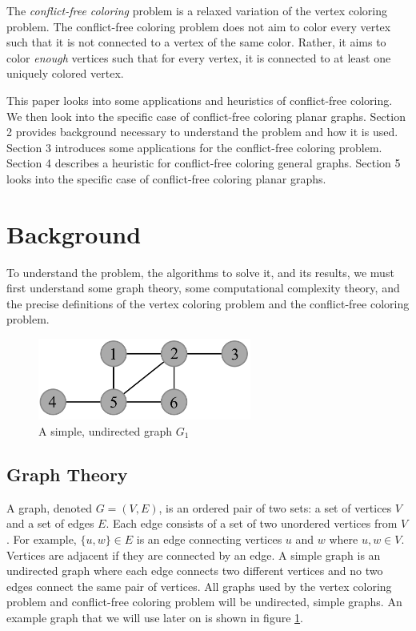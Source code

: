 \documentclass{sig-alternate}
\begin{document}
The \emph{conflict-free coloring} problem is a relaxed variation of the vertex coloring problem. The conflict-free coloring problem does not aim to color every vertex such that it is not connected to a vertex of the same color. Rather, it aims to color \emph{enough} vertices such that for every vertex, it is connected to at least one uniquely colored vertex.

This paper looks into some applications and heuristics of conflict-free coloring. We then look into the specific case of conflict-free coloring planar graphs. Section 2 provides background necessary to understand the problem and how it is used. Section 3 introduces some applications for the conflict-free coloring problem. Section 4 describes a heuristic for conflict-free coloring general graphs. Section 5 looks into the specific case of conflict-free coloring planar graphs.


\section{Background}
\label{sec:background}
To understand the problem, the algorithms to solve it, and its results, we must first understand some graph theory, some computational complexity theory, and the precise definitions of the vertex coloring problem and the conflict-free coloring problem.

\begin{figure}[h]
	\centering
	\includegraphics[width=7cm]{../figures/example.pdf}
	\caption{A simple, undirected graph $G_1$}\label{fig:graph}
\end{figure}

\subsection{Graph Theory}
\label{sec:graphtheory}

A graph, denoted $G=(V,E)$, is an ordered pair of two sets: a set of vertices $V$ and a set of edges $E$. Each edge consists of a set of two unordered vertices from $V$. For example, $\{u, w\} \in E$ is an edge connecting vertices $u$ and $w$ where $u,w \in V$. Vertices are adjacent if they are connected by an edge. A simple graph is an undirected graph where each edge connects two different vertices and no two edges connect the same pair of vertices. All graphs used by the vertex coloring problem and conflict-free coloring problem will be undirected, simple graphs. An example graph that we will use later on is shown in figure \ref{fig:graph}.
\end{document}
